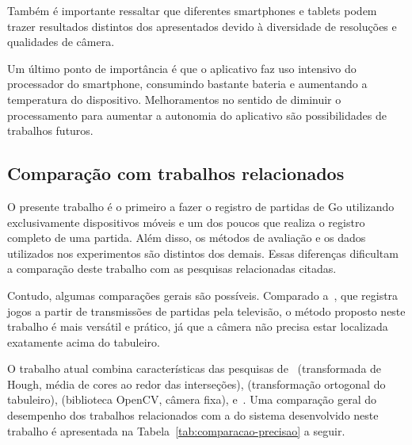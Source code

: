 Também é importante ressaltar que diferentes smartphones e tablets podem trazer resultados distintos dos apresentados devido à diversidade de resoluções e qualidades de câmera.

Um último ponto de importância é que o aplicativo faz uso intensivo do processador do smartphone, consumindo bastante bateria e aumentando a temperatura do dispositivo. Melhoramentos no sentido de diminuir o processamento para aumentar a autonomia do aplicativo são possibilidades de trabalhos futuros.

\subsection{Comparação com trabalhos relacionados}

O presente trabalho é o primeiro a fazer o registro de partidas de Go utilizando exclusivamente dispositivos móveis e um dos poucos que realiza o registro completo de uma partida. Além disso, os métodos de avaliação e os dados utilizados nos experimentos são distintos dos demais. %
Essas diferenças dificultam a comparação deste trabalho com as pesquisas relacionadas citadas.

Contudo, algumas comparações gerais são possíveis. Comparado a~, que registra jogos a partir de transmissões de partidas pela televisão, o método proposto neste trabalho é mais versátil e prático, já que a câmera não precisa estar localizada exatamente acima do tabuleiro.%

O trabalho atual combina características das pesquisas de~ (transformada de Hough, média de cores ao redor das interseções),  (transformação ortogonal do tabuleiro),  (biblioteca OpenCV, câmera fixa),  e~. Uma comparação geral do desempenho dos trabalhos relacionados com a do sistema desenvolvido neste trabalho é apresentada na Tabela~\ref{tab:comparacao-precisao} a seguir.

